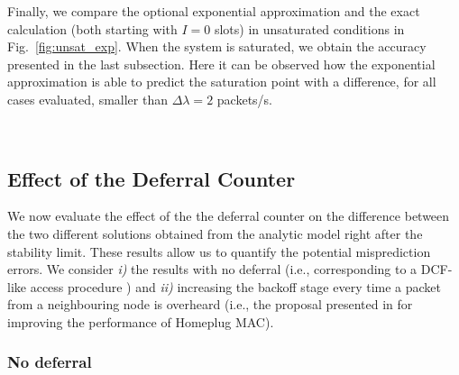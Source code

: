 \documentclass[preprint,12pt]{elsarticle}
\begin{document}
Finally, we compare the optional exponential approximation and the exact calculation (both starting with $I=0$ slots) in unsaturated conditions in Fig.~\ref{fig:unsat_exp}. When the system is saturated, we obtain the accuracy presented in the last subsection. Here it can be observed how the exponential approximation is able to predict the saturation point with a difference, for all cases evaluated, smaller than $\Delta\lambda=2$ packets/s.

\begin{figure*}[!tb]
\centering
{}
\\
\caption{Performance results in unsaturated conditions. Comparison among the exact analysis and the exponential approximation to $p_{\rm defer}^{(i)}$.}
\label{fig:unsat_exp}
\end{figure*}

\subsection{Effect of the Deferral Counter}

We now evaluate the effect of the the deferral counter on the difference between the two different solutions obtained from the analytic model right after the stability limit. These results allow us to quantify the potential misprediction errors. We consider \emph{i)} the results with no deferral (i.e., corresponding to a DCF-like access procedure \cite{IEEE80211-IEEESTD1999}) and \emph{ii)} increasing the backoff stage every time a packet from a neighbouring node is overheard (i.e., the proposal presented in \cite{campista2005improving} for improving the performance of Homeplug MAC). 

\subsubsection{No deferral}
\end{document}
